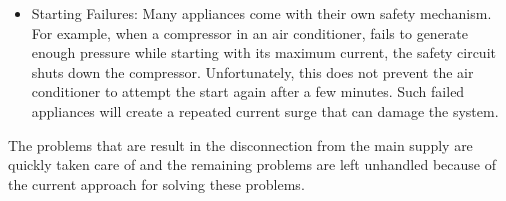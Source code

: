 \begin{itemize}
\item Starting Failures: Many appliances come with their own safety mechanism. For example, when a compressor in an air conditioner, fails to generate enough pressure while starting with its maximum current, the safety circuit shuts down the compressor. Unfortunately, this does not prevent the air conditioner to attempt the start again after a few minutes. Such failed appliances will create a repeated current surge that can damage the system.
\end{itemize}

The problems that are result in the disconnection from the main supply are quickly taken care of and the remaining problems are left unhandled because of the current approach for solving these problems.